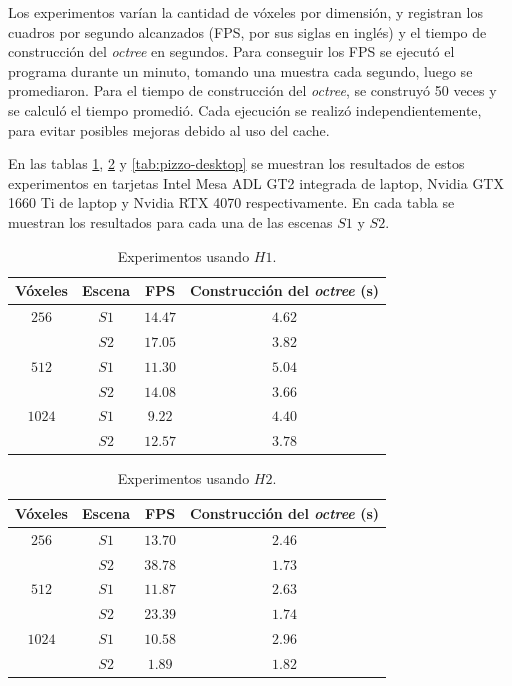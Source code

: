Los experimentos varían la cantidad de vóxeles por dimensión, y registran los cuadros por segundo alcanzados (FPS, por sus siglas en inglés) y el tiempo de construcción del \textit{octree} en segundos.
Para conseguir los FPS se ejecutó el programa durante un minuto, tomando una muestra cada segundo, luego se promediaron.
Para el tiempo de construcción del \textit{octree}, se construyó 50 veces y se calculó el tiempo promedió.
Cada ejecución se realizó independientemente, para evitar posibles mejoras debido al uso del cache.

En las tablas \ref{tab:cisco-laptop}, \ref{tab:pizzo-laptop} y \ref{tab:pizzo-desktop} se muestran los resultados de estos experimentos en tarjetas Intel Mesa ADL GT2 integrada de laptop, Nvidia GTX 1660 Ti de laptop y Nvidia RTX 4070 respectivamente.
En cada tabla se muestran los resultados para cada una de las escenas $S1$ y $S2$.

\begin{table}[ht]
\centering
\begin{tabular}{|c|c|c|c|}
	\hline
	\textbf{Vóxeles} & \textbf{Escena} & \textbf{FPS} & \textbf{Construcción del \textit{octree} (s)} \\
	\hline
	$256$ & $S1$ & $14.47$ & $4.62$ \\
	 & $S2$ & $17.05$ & $3.82$ \\
	\hline
	$512$ & $S1$ & $11.30$ & $5.04$ \\
	 & $S2$ & $14.08$ & $3.66$ \\
	\hline
	$1024$ & $S1$ & $9.22$ & $4.40$ \\
	 & $S2$ & $12.57$ & $3.78$ \\
	\hline
\end{tabular}
\caption{Experimentos usando $H1$.}
\label{tab:cisco-laptop}
\end{table}

\begin{table}[hb]
\centering
\begin{tabular}{|c|c|c|c|}
	\hline
	\textbf{Vóxeles} & \textbf{Escena} & \textbf{FPS} & \textbf{Construcción del \textit{octree} (s)} \\
	\hline
	$256$ & $S1$ & $13.70$ & $2.46$ \\
	 & $S2$ & $38.78$ & $1.73$ \\
	\hline
	$512$ & $S1$ & $11.87$ & $2.63$ \\
	 & $S2$ & $23.39$ & $1.74$ \\
	\hline
	$1024$ & $S1$ & $10.58$ & $2.96$ \\
	 & $S2$ & $1.89$ & $1.82$ \\
	\hline
\end{tabular}
\caption{Experimentos usando $H2$.}
\label{tab:pizzo-laptop}
\end{table}

